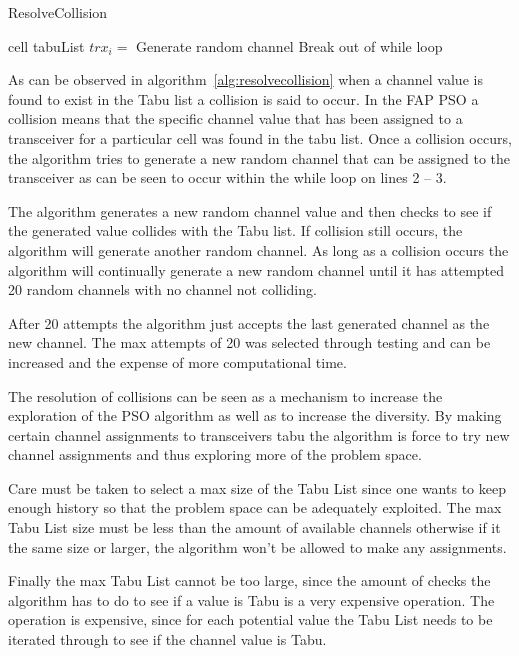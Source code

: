 \begin{algorithm}
\caption{ResolveCollision}
\label{alg:resolvecollision}
\begin{algorithmic}[1]
	\REQUIRE cell
	\REQUIRE tabuList
				\STATE $trx_i = $ Generate random channel
					\STATE Break out of while loop
				\ENDIF
			\ENDWHILE
	\ENDFOR
\end{algorithmic}
\end{algorithm}

As can be observed in algorithm~\ref{alg:resolvecollision} when a channel value is found to exist in the Tabu list a collision is said to occur. In the FAP PSO a collision means that the specific channel value that has been assigned to a transceiver for a particular cell was found in the tabu list. Once a collision occurs, the algorithm tries to generate a new random channel that can be assigned to the transceiver as can be seen to occur within the while loop on lines 2 -- 3.

The algorithm generates a new random channel value and then checks to see if the generated value collides with the Tabu list. If collision still occurs, the algorithm will generate another random channel. As long as a collision occurs the algorithm will continually generate a new random channel until it has attempted 20 random channels with no channel not colliding. 

After 20 attempts the algorithm just accepts the last generated channel as the new channel. The max attempts of 20 was selected through testing and can be increased and the expense of more computational time. 

The resolution of collisions can be seen as a mechanism to increase the exploration of the PSO algorithm as well as to increase the diversity. By making certain channel assignments to transceivers tabu the algorithm is force to try new channel assignments and thus exploring more of the problem space.

Care must be taken to select a max size of the Tabu List since one wants to keep enough history so that the problem space can be adequately exploited. The max Tabu List size must be less than the amount of available channels otherwise if it the same size or larger, the algorithm won't be allowed to make any assignments. 

Finally the max Tabu List cannot be too large, since the amount of checks the algorithm has to do to see if a value is Tabu is a very expensive operation. The operation is expensive, since for each potential value the Tabu List needs to be iterated through to see if the channel value is Tabu.


